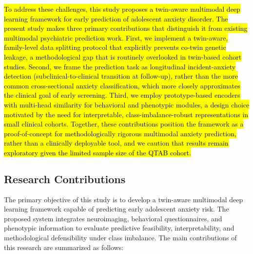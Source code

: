 \documentclass[10pt,letterpaper]{article}
\begin{document}
        \hl{To address these challenges, this study proposes a twin-aware multimodal deep learning framework for early prediction of adolescent anxiety disorder. The present study makes three primary contributions that distinguish it from existing multimodal psychiatric prediction work. First, we implement a twin-aware, family-level data splitting protocol that explicitly prevents co-twin genetic leakage, a methodological gap that is routinely overlooked in twin-based cohort studies. Second, we frame the prediction task as longitudinal incident-anxiety detection (subclinical-to-clinical transition at follow-up), rather than the more common cross-sectional anxiety classification, which more closely approximates the clinical goal of early screening. Third, we employ prototype-based encoders with multi-head similarity for behavioral and phenotypic modules, a design choice motivated by the need for interpretable, class-imbalance-robust representations in small clinical cohorts. Together, these contributions position the framework as a proof-of-concept for methodologically rigorous multimodal anxiety prediction, rather than a clinically deployable tool, and we caution that results remain exploratory given the limited sample size of the QTAB cohort.}

                \subsection*{Research Contributions}

        The primary objective of this study is to develop a twin-aware
        multimodal deep learning framework capable of predicting early
        adolescent anxiety risk. The proposed system integrates
        neuroimaging, behavioral questionnaires, and phenotypic
        information to evaluate predictive feasibility, interpretability,
        and methodological defensibility under class imbalance. The main contributions of this research
        are summarized as follows:
\end{document}
